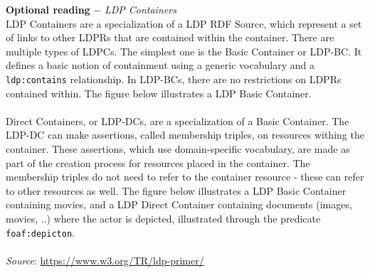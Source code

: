 \newpage
\begin{formal}
\textbf{Optional reading} $ - $
\textit{LDP Containers}\\

\noindent LDP Containers are a specialization of a LDP \gls{RDF} Source, which represent a set of links to other LDPRs that are contained within the container. There are multiple types of LDPCs. The simplest one is the Basic Container or LDP-BC. It defines a basic notion of containment using a generic vocabulary and a \texttt{ldp:contains} relationship. In LDP-BCs, there are no restrictions on LDPRs contained within. The figure below illustrates a LDP Basic Container.\\
\\
\noindent Direct Containers, or LDP-DCs, are a specialization of a Basic Container. The LDP-DC can make assertions, called membership triples, on resources withing the container. These assertions, which use domain-specific vocabulary, are made as part of the creation process for resources placed in the container. The membership triples do not need to refer to the container resource - these can refer to other resources as well. The figure below illustrates a LDP Basic Container containing movies, and a LDP Direct Container containing documents (images, movies, ..) where the actor is depicted, illustrated through the predicate \texttt{foaf:depicton}. \\
\\

\noindent \textit{Source}: \url{https://www.w3.org/TR/ldp-primer/}
\end{formal}

